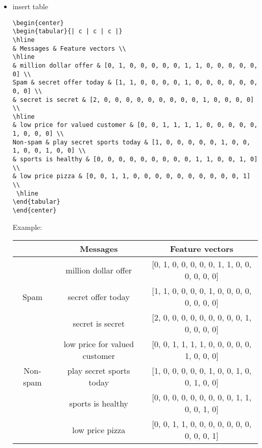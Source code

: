 \documentclass[twoside,12pt]{article}
\begin{document}
\begin{itemize}
\item insert table \\
\begin{lstlisting}
\begin{center}
\begin{tabular}{| c | c | c |}
\hline
& Messages & Feature vectors \\
\hline
& million dollar offer & [0, 1, 0, 0, 0, 0, 0, 1, 1, 0, 0, 0, 0, 0, 0] \\
Spam & secret offer today & [1, 1, 0, 0, 0, 0, 1, 0, 0, 0, 0, 0, 0, 0, 0] \\
& secret is secret & [2, 0, 0, 0, 0, 0, 0, 0, 0, 0, 1, 0, 0, 0, 0] \\
\hline
& low price for valued customer & [0, 0, 1, 1, 1, 1, 0, 0, 0, 0, 0, 1, 0, 0, 0] \\
Non-spam & play secret sports today & [1, 0, 0, 0, 0, 0, 1, 0, 0, 1, 0, 0, 1, 0, 0] \\
& sports is healthy & [0, 0, 0, 0, 0, 0, 0, 0, 0, 1, 1, 0, 0, 1, 0] \\
& low price pizza & [0, 0, 1, 1, 0, 0, 0, 0, 0, 0, 0, 0, 0, 0, 1] \\
 \hline
\end{tabular}
\end{center}
\end{lstlisting}
Example: 
\begin{center}
\begin{tabular}{| c | c | c |}
\hline
& Messages & Feature vectors \\
\hline
& million dollar offer & [0, 1, 0, 0, 0, 0, 0, 1, 1, 0, 0, 0, 0, 0, 0] \\
Spam & secret offer today & [1, 1, 0, 0, 0, 0, 1, 0, 0, 0, 0, 0, 0, 0, 0] \\
& secret is secret & [2, 0, 0, 0, 0, 0, 0, 0, 0, 0, 1, 0, 0, 0, 0] \\
\hline
& low price for valued customer & [0, 0, 1, 1, 1, 1, 0, 0, 0, 0, 0, 1, 0, 0, 0] \\
Non-spam & play secret sports today & [1, 0, 0, 0, 0, 0, 1, 0, 0, 1, 0, 0, 1, 0, 0] \\
& sports is healthy & [0, 0, 0, 0, 0, 0, 0, 0, 0, 1, 1, 0, 0, 1, 0] \\
& low price pizza & [0, 0, 1, 1, 0, 0, 0, 0, 0, 0, 0, 0, 0, 0, 1] \\
 \hline
\end{tabular}
\end{center}

\end{itemize}
\end{document}
